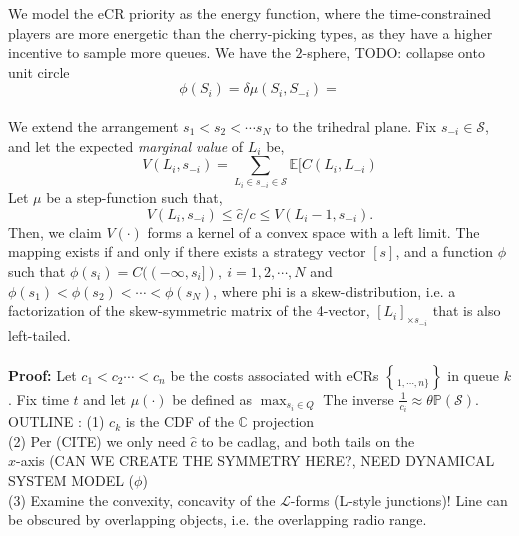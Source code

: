 \documentclass[10pt]{article}
\newcommand{\mcL}{\mathcal{L}}
\newcommand{\mcS}{\mathcal{S}}
\theoremstyle{definition}
\begin{document}
We model the eCR priority as the energy function, where the
time-constrained players are more energetic than the cherry-picking types, as
they have a higher incentive to sample more queues.
We have the $2$-sphere, TODO: collapse onto unit circle
$$
    \phi(S_i) = \delta\mu(S_i, S_{-i}) = 
$$
{\\
We extend the arrangement $s_1<s_2<\cdots s_N$ to the trihedral plane. Fix
$s_{-i}\in \mcS$, and let the expected \emph{marginal value} of $L_i$ be,
$$
    V(L_i,s_{-i}) = \displaystyle\sum_{L_i\in s_{-i}\in \mcS}\mathbb{E}[C(L_i, L_{-i})
$$
Let $\mu$ be a step-function such that,
$$
    V(L_i,s_{-i}) \le \hat c/ c \le V(L_i-1, s_{-i}).
$$
Then, we claim $V(\cdot)$ forms a kernel of a convex space with a left limit.
The mapping exists if and only if there exists a strategy vector $[s]$, and a
function $\phi$ such that $\phi(s_i) = C((-\infty,s_i]), \ i = 1,2,\cdots, N$ and $\phi(s_1) < \phi(s_2) < \cdots < \phi(s_N)$, where phi is a skew-distribution, i.e. a
factorization of the skew-symmetric
matrix of the 4-vector, $[L_i]_{\times s_{-i}}$ that is also left-tailed.\\
}\\
\textbf{Proof:} 
Let $c_1 < c_2 \cdots < c_n$ be the costs associated with eCRs $\brace 1,\cdots,
n\rbrace$ in queue $k$. Fix time $t$ and let $\mu(\cdot)$ be defined as
$\max_{s_i\in Q}$ The inverse $\frac{1}{c_i} \approx 
\theta\mathbb{P(\mcS)}$. %
OUTLINE : (1) $c_k$ is the CDF of the $\mathbb{C}$ projection\\
(2) Per (CITE) we only need $\hat c$ to be cadlag, and both tails on the\\
$x$-axis (CAN WE CREATE THE SYMMETRY HERE?, NEED DYNAMICAL SYSTEM MODEL
($\phi$)\\
(3) Examine the convexity, concavity of the $\mcL$-forms (L-style junctions)!
Line can be obscured by overlapping objects, i.e. the overlapping radio range.
\end{document}
